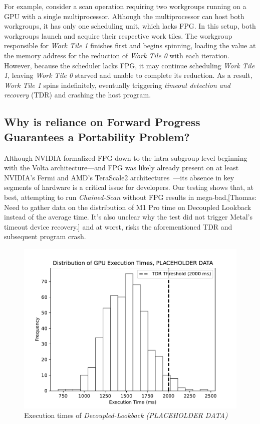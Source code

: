 \documentclass[sigconf]{acmart}
\newcommand{\thomas}[1]{{\footnotesize\color{orange}[Thomas: #1]}}
\begin{document}
For example, consider a scan operation requiring two workgroups running on a GPU with a single multiprocessor. Although the multiprocessor can host both workgroups, it has only one scheduling unit, which lacks FPG\@. In this setup, both workgroups launch and acquire their respective work tiles. The workgroup responsible for \emph{Work Tile 1} finishes first and begins spinning, loading the value at the memory address for the reduction of \emph{Work Tile 0} with each iteration. However, because the scheduler lacks FPG, it may continue scheduling \emph{Work Tile 1}, leaving \emph{Work Tile 0} starved and unable to complete its reduction. As a result, \emph{Work Tile 1} spins indefinitely, eventually triggering \emph{timeout detection and recovery} (TDR) and crashing the host program.

\subsection{Why is reliance on Forward Progress Guarantees a Portability Problem?}
Although NVIDIA formalized FPG down to the intra-subgroup level beginning with the Volta architecture---and FPG was likely already present on at least NVIDIA's Fermi and AMD's TeraScale2 architectures~\cite{}---its absence in key segments of hardware is a critical issue for developers. Our testing shows that, at best, attempting to run \emph{Chained-Scan} without FPG results in mega-bad,\thomas{Need to gather data on the distribution of M1 Pro time on Decoupled Lookback instead of the average time. It's also unclear why the test did not trigger Metal's timeout device recovery.} and at worst, risks the aforementioned TDR and subsequent program crash.

\begin{figure}[h]
  \centering
  \includegraphics[width=\linewidth]{graphics/Figure_1.pdf}
  \caption{Execution times of \emph{Decoupled-Lookback (PLACEHOLDER DATA)}}
\end{figure}
\end{document}
